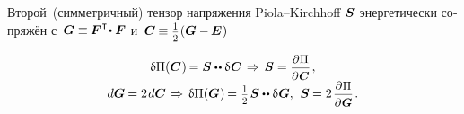 \begin{otherlanguage}{russian}
Второй~(симметричный) тензор напряжения Piola--Kirch\-hoff $\bm{S}$ энергетически сопряжён с~${\bm{G} \equiv \hspace{-0.1ex} \bm{F}^{\hspace{.1ex}\T} \hspace{-0.36ex} \dotp \bm{F}}$ и~${\bm{C} \hspace{-0.1ex} \equiv \smalldisplaystyleonehalf \hspace{.1ex} (\bm{G} - \hspace{-0.12ex} \UnitDyad \hspace{.1ex})}$

\nopagebreak\vspace{-0.4em}\begin{equation}
\begin{array}{c}
\variation{\potential}(\bm{C}\hspace{.1ex}) \hspace{-0.2ex} = \secondpiolakirchhoffstress \dotdotp \variation{\hspace{.1ex} \bm{C}}
\hspace{.25ex} \Rightarrow \hspace{.32ex}
\secondpiolakirchhoffstress = \scalebox{0.92}{$ \displaystyle \frac{\partial \hspace{.1ex} \potential}{\raisemath{-0.1em}{\partial \hspace{.1ex} \bm{C}}} $} \hspace{.24ex} , \\[.5em]
%
d\bm{G} \hspace{-0.12ex} = 2 \hspace{.2ex} d \bm{C}
\hspace{.25ex} \Rightarrow \hspace{.32ex}
\variation{\potential}(\bm{G}\hspace{.1ex}) \hspace{-0.2ex} = \hspace{.1ex} \smalldisplaystyleonehalf \hspace{.2ex} \secondpiolakirchhoffstress \dotdotp \variation{\hspace{.1ex} \bm{G}} ,
\:\,
\secondpiolakirchhoffstress \hspace{-0.1ex} = 2 \hspace{.25ex} \scalebox{0.92}{$ \displaystyle \frac{\partial \hspace{.1ex} \potential}{\raisemath{-0.1em}{\partial \hspace{.1ex} \bm{G}}} $} \hspace{.25ex}.
\end{array}
\end{equation}


\end{otherlanguage}
